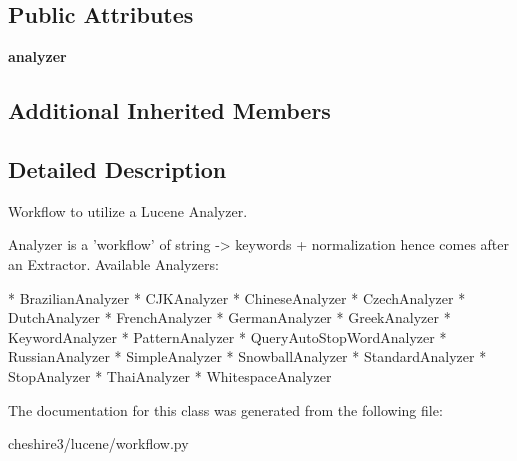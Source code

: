 \subsection*{Public Attributes}
\begin{DoxyCompactItemize}
\item 
\hypertarget{classcheshire3_1_1lucene_1_1workflow_1_1_analyzer_workflow_a3d2d751a13cfff89c301bedd6e927ff2}{{\bfseries analyzer}}\label{classcheshire3_1_1lucene_1_1workflow_1_1_analyzer_workflow_a3d2d751a13cfff89c301bedd6e927ff2}

\end{DoxyCompactItemize}
\subsection*{Additional Inherited Members}


\subsection{Detailed Description}
\begin{DoxyVerb}Workflow to utilize a Lucene Analyzer.

Analyzer is a 'workflow' of string -> keywords + normalization
hence comes after an Extractor. Available Analyzers:

* BrazilianAnalyzer
* CJKAnalyzer
* ChineseAnalyzer
* CzechAnalyzer
* DutchAnalyzer
* FrenchAnalyzer
* GermanAnalyzer
* GreekAnalyzer
* KeywordAnalyzer
* PatternAnalyzer
* QueryAutoStopWordAnalyzer
* RussianAnalyzer
* SimpleAnalyzer
* SnowballAnalyzer
* StandardAnalyzer
* StopAnalyzer
* ThaiAnalyzer
* WhitespaceAnalyzer
\end{DoxyVerb}
 

The documentation for this class was generated from the following file\-:\begin{DoxyCompactItemize}
\item 
cheshire3/lucene/workflow.\-py\end{DoxyCompactItemize}
